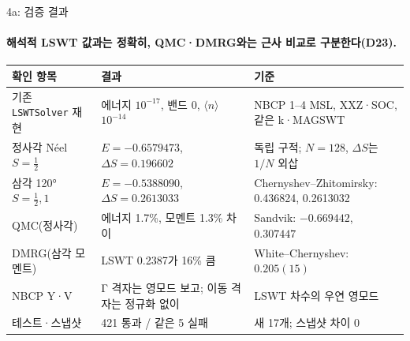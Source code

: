\begin{frame}[label=stage4a-verification]{4a: 검증 결과}
  \framesubtitle{해석적 LSWT 값과는 정확히, QMC·DMRG와는 근사 비교로 구분한다(D23).}
  \footnotesize\renewcommand{\arraystretch}{1.08}
  \begin{tabularx}{\textwidth}{@{}P{3.1cm}P{3.3cm}Y@{}}
    \toprule
    확인 항목 & 결과 & 기준 \\
    \midrule
    기존 \texttt{LSWTSolver} 재현 & 에너지 $10^{-17}$, 밴드 0, $\langle n\rangle$ $10^{-14}$ & NBCP 1--4 MSL, XXZ·SOC, 같은 k·MAGSWT \\
    정사각 Néel $S=\tfrac12$ & $E=-0.6579473$, $\Delta S=0.196602$ & 독립 구적; $N=128$, $\Delta S$는 $1/N$ 외삽 \\
    삼각 120° $S=\tfrac12,1$ & $E=-0.5388090$, $\Delta S=0.2613033$ & Chernyshev–Zhitomirsky: 0.436824, 0.2613032 \\
    QMC(정사각) & 에너지 1.7\%, 모멘트 1.3\% 차이 & Sandvik: $-0.669442$, $0.307447$ \\
    DMRG(삼각 모멘트) & LSWT 0.2387가 16\% 큼 & White–Chernyshev: $0.205(15)$ \\
    NBCP Y·V & Γ 격자는 영모드 보고; 이동 격자는 정규화 없이 & LSWT 차수의 우연 영모드 \\
    테스트·스냅샷 & 421 통과 / 같은 5 실패 & 새 17개; 스냅샷 차이 0 \\
    \bottomrule
  \end{tabularx}
\end{frame}

